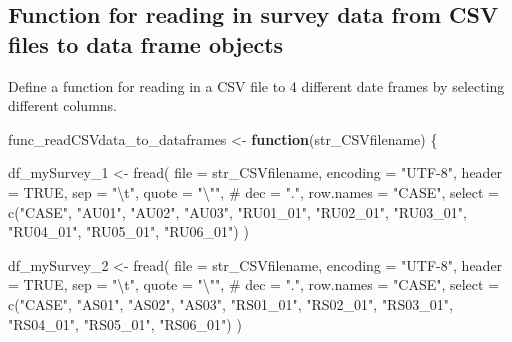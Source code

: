 \documentclass[
]{article}
\newenvironment{Shaded}{\begin{snugshade}}{\end{snugshade}}
\newcommand{\AttributeTok}[1]{\textcolor[rgb]{0.00,0.34,0.68}{#1}}
\newcommand{\CommentTok}[1]{\textcolor[rgb]{0.54,0.53,0.53}{#1}}
\newcommand{\ConstantTok}[1]{\textcolor[rgb]{0.67,0.33,0.00}{#1}}
\newcommand{\ControlFlowTok}[1]{\textcolor[rgb]{0.12,0.11,0.11}{\textbf{#1}}}
\newcommand{\FunctionTok}[1]{\textcolor[rgb]{0.39,0.29,0.61}{#1}}
\newcommand{\NormalTok}[1]{\textcolor[rgb]{0.12,0.11,0.11}{#1}}
\newcommand{\OtherTok}[1]{\textcolor[rgb]{0.00,0.43,0.16}{#1}}
\newcommand{\SpecialCharTok}[1]{\textcolor[rgb]{0.24,0.68,0.91}{#1}}
\newcommand{\StringTok}[1]{\textcolor[rgb]{0.75,0.01,0.01}{#1}}
\begin{document}
\hypertarget{function-for-reading-in-survey-data-from-csv-files-to-data-frame-objects}{%
\subsection{Function for reading in survey data from CSV files to data
frame
objects}\label{function-for-reading-in-survey-data-from-csv-files-to-data-frame-objects}}

Define a function for reading in a CSV file to 4 different date frames
by selecting different columns.

\begin{Shaded}
\begin{Highlighting}[]
\NormalTok{func\_readCSVdata\_to\_dataframes }\OtherTok{\textless{}{-}} \ControlFlowTok{function}\NormalTok{(str\_CSVfilename) \{}
  
\NormalTok{  df\_mySurvey\_1 }\OtherTok{\textless{}{-}} \FunctionTok{fread}\NormalTok{(}
    \AttributeTok{file =}\NormalTok{ str\_CSVfilename, }\AttributeTok{encoding =} \StringTok{"UTF{-}8"}\NormalTok{,}
    \AttributeTok{header =} \ConstantTok{TRUE}\NormalTok{, }\AttributeTok{sep =} \StringTok{"}\SpecialCharTok{\textbackslash{}t}\StringTok{"}\NormalTok{, }\AttributeTok{quote =} \StringTok{"}\SpecialCharTok{\textbackslash{}"}\StringTok{"}\NormalTok{,}
    \CommentTok{\# dec = ".", row.names = "CASE",}
    \AttributeTok{select =} \FunctionTok{c}\NormalTok{(}\StringTok{"CASE"}\NormalTok{, }\StringTok{"AU01"}\NormalTok{, }\StringTok{"AU02"}\NormalTok{, }\StringTok{"AU03"}\NormalTok{, }
               \StringTok{"RU01\_01"}\NormalTok{, }\StringTok{"RU02\_01"}\NormalTok{, }\StringTok{"RU03\_01"}\NormalTok{, }\StringTok{"RU04\_01"}\NormalTok{, }\StringTok{"RU05\_01"}\NormalTok{, }\StringTok{"RU06\_01"}\NormalTok{)}
\NormalTok{    )}
  
\NormalTok{  df\_mySurvey\_2 }\OtherTok{\textless{}{-}} \FunctionTok{fread}\NormalTok{(}
    \AttributeTok{file =}\NormalTok{ str\_CSVfilename, }\AttributeTok{encoding =} \StringTok{"UTF{-}8"}\NormalTok{,}
    \AttributeTok{header =} \ConstantTok{TRUE}\NormalTok{, }\AttributeTok{sep =} \StringTok{"}\SpecialCharTok{\textbackslash{}t}\StringTok{"}\NormalTok{, }\AttributeTok{quote =} \StringTok{"}\SpecialCharTok{\textbackslash{}"}\StringTok{"}\NormalTok{,}
    \CommentTok{\# dec = ".", row.names = "CASE",}
    \AttributeTok{select =} \FunctionTok{c}\NormalTok{(}\StringTok{"CASE"}\NormalTok{, }\StringTok{"AS01"}\NormalTok{, }\StringTok{"AS02"}\NormalTok{, }\StringTok{"AS03"}\NormalTok{, }
               \StringTok{"RS01\_01"}\NormalTok{, }\StringTok{"RS02\_01"}\NormalTok{, }\StringTok{"RS03\_01"}\NormalTok{, }\StringTok{"RS04\_01"}\NormalTok{, }\StringTok{"RS05\_01"}\NormalTok{, }\StringTok{"RS06\_01"}\NormalTok{)}
\NormalTok{    )}
  

\end{Highlighting}
\end{Shaded}
\end{document}
